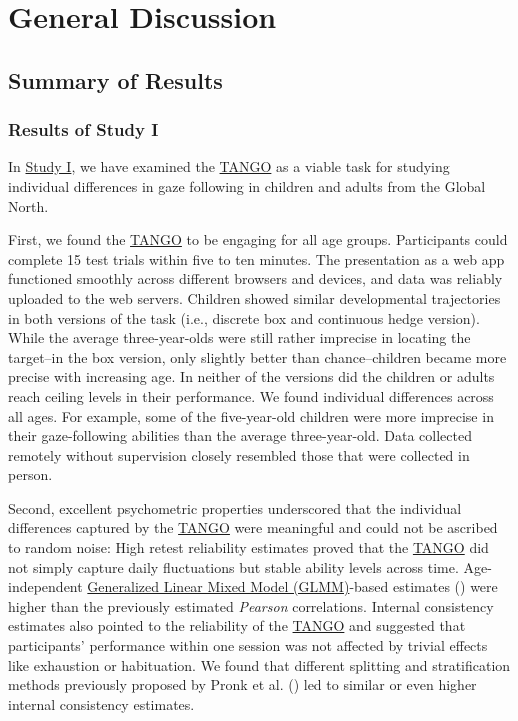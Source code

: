 \documentclass[
]{scrbook}
\begin{document}
\chapter{General Discussion}\label{discussion}

\section{Summary of Results}\label{summary-of-results}

\subsection{Results of Study I}\label{results-studyI}

In \hyperref[studyI]{Study I}, we have examined the \hyperref[acronyms_TANGO]{TANGO} as a viable task for studying individual differences in gaze following in children and adults from the Global North.

First, we found the \hyperref[acronyms_TANGO]{TANGO} to be engaging for all age groups. Participants could complete 15 test trials within five to ten minutes. The presentation as a web app functioned smoothly across different browsers and devices, and data was reliably uploaded to the web servers. Children showed similar developmental trajectories in both versions of the task (i.e., discrete box and continuous hedge version). While the average three-year-olds were still rather imprecise in locating the target\thinspace --\thinspace in the box version, only slightly better than chance\thinspace --\thinspace children became more precise with increasing age. In neither of the versions did the children or adults reach ceiling levels in their performance. We found individual differences across all ages. For example, some of the five-year-old children were more imprecise in their gaze-following abilities than the average three-year-old. Data collected remotely without supervision closely resembled those that were collected in person.

Second, excellent psychometric properties underscored that the individual differences captured by the \hyperref[acronyms_TANGO]{TANGO} were meaningful and could not be ascribed to random noise: High retest reliability estimates proved that the \hyperref[acronyms_TANGO]{TANGO} did not simply capture daily fluctuations but stable ability levels across time. Age-independent \hyperref[acronyms_GLMM]{Generalized Linear Mixed Model (GLMM)}-based estimates () were higher than the previously estimated \emph{Pearson} correlations. Internal consistency estimates also pointed to the reliability of the \hyperref[acronyms_TANGO]{TANGO} and suggested that participants' performance within one session was not affected by trivial effects like exhaustion or habituation. We found that different splitting and stratification methods previously proposed by Pronk et al. () led to similar or even higher internal consistency estimates.
\end{document}
